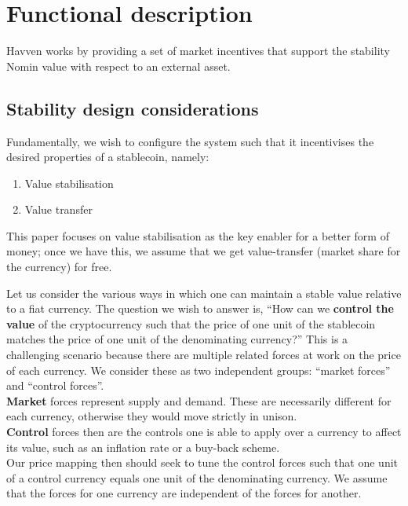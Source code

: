 \section{Functional description}

Havven works by providing a set of market incentives that support the stability Nomin value with respect to an external asset.

\subsection{Stability design considerations}

Fundamentally, we wish to configure the system such that it incentivises the desired properties of a stablecoin, namely:
\begin{enumerate}
    \item Value stabilisation
    \item Value transfer
\end{enumerate}

This paper focuses on value stabilisation as the key enabler for a better form of money; once we have this, we assume that we get value-transfer (market share for the currency) for free.

Let us consider the various ways in which one can maintain a stable value relative to a fiat currency. The question we wish to answer is, ``How can we \textbf{control the value} of the cryptocurrency such that the price of one unit of the stablecoin matches the price of one unit of the denominating currency?'' This is a challenging scenario because there are multiple related forces at work on the price of each currency. We consider these as two independent groups: ``market forces'' and ``control forces''. \\

\noindent \textbf{Market} forces represent supply and demand. These are necessarily different for each currency, otherwise they would move strictly in unison. \\

\noindent \textbf{Control} forces then are the controls one is able to apply over a currency to affect its value, such as an inflation rate or a buy-back scheme. \\

\noindent Our price mapping then should seek to tune the control forces such that one unit of a control currency equals one unit of the denominating currency. We assume that the forces for one currency are independent of the forces for another. \\

